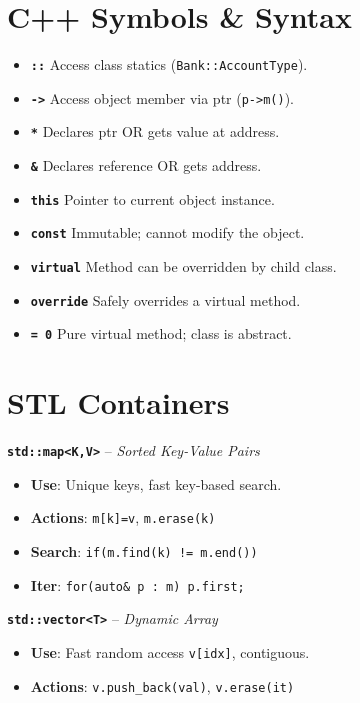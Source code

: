 \documentclass[9pt,twocolumn]{article}
\begin{document}
\section*{C++ Symbols \& Syntax}
\begin{itemize}
    \setlength\itemsep{-0.3em}
    \item \textbf{\texttt{::}} Access class statics (\texttt{Bank::AccountType}).
    \item \textbf{\texttt{->}} Access object member via ptr (\texttt{p->m()}).
    \item \textbf{\texttt{*}} Declares ptr OR gets value at address.
    \item \textbf{\texttt{\&}} Declares reference OR gets address.
    \item \textbf{\texttt{this}} Pointer to current object instance.
    \item \textbf{\texttt{const}} Immutable; cannot modify the object.
    \item \textbf{\texttt{virtual}} Method can be overridden by child class.
    \item \textbf{\texttt{override}} Safely overrides a virtual method.
    \item \textbf{\texttt{= 0}} Pure virtual method; class is abstract.
\end{itemize}

\section*{STL Containers}
\textbf{\texttt{std::map<K,V>}} -- \textit{Sorted Key-Value Pairs}
\begin{itemize}
    \setlength\itemsep{-0.3em}
    \item \textbf{Use}: Unique keys, fast key-based search.
    \item \textbf{Actions}: \texttt{m[k]=v}, \texttt{m.erase(k)}
    \item \textbf{Search}: \texttt{if(m.find(k) != m.end())}
    \item \textbf{Iter}: \texttt{for(auto\& p : m) p.first;}
\end{itemize}

\textbf{\texttt{std::vector<T>}} -- \textit{Dynamic Array}
\begin{itemize}
    \setlength\itemsep{-0.3em}
    \item \textbf{Use}: Fast random access \texttt{v[idx]}, contiguous.
    \item \textbf{Actions}: \texttt{v.push\_back(val)}, \texttt{v.erase(it)}
\end{itemize}
\end{document}
